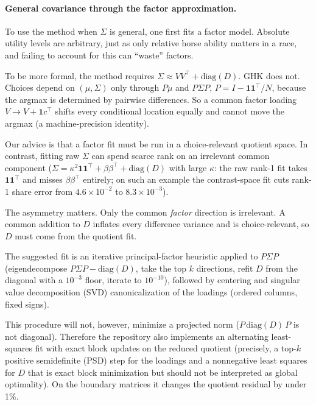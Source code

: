 \documentclass[12pt]{article}
\theoremstyle{remark}
\begin{document}
\paragraph{General covariance through the factor approximation.} 

To use the method when $\Sigma$ is general, one first fits a factor
model. Absolute utility levels are arbitrary, just as only relative
horse ability matters in a race, and failing to account for this can
``waste'' factors. 

To be more formal, the method
requires $\Sigma \approx VV^\top + \mathrm{diag}(D)$. GHK does not. Choices depend on
$(\mu, \Sigma)$ only through $P\mu$ and $P\Sigma P$, $P = I -
\mathbf{1}\mathbf{1}^\top/N$, because the argmax is determined by
pairwise differences. So a common factor loading $V \to V +
\mathbf{1}c^\top$ shifts every conditional location equally and cannot move
the argmax (a machine-precision identity). 

Our advice is that a factor fit must be run in a choice-relevant
quotient space. In contrast, fitting raw $\Sigma$ can spend
scarce rank on an irrelevant common component ($\Sigma = \kappa^2
\mathbf{1}\mathbf{1}^\top + \beta\beta^\top + \mathrm{diag}(D)$ with large $\kappa$: the
raw rank-1 fit takes $\mathbf{1}\mathbf{1}^\top$ and misses
$\beta\beta^\top$ entirely; on such an example the contrast-space fit cuts
rank-1 share error from $4.6\times10^{-2}$ to $8.3\times10^{-3}$).

The asymmetry matters. Only the common \emph{factor} direction is
irrelevant. A common addition to $D$ inflates every difference variance
and is choice-relevant, so $D$ must come from the quotient fit.

The suggested fit is an iterative principal-factor heuristic applied to $P\Sigma P$ (eigendecompose
$P\Sigma P - \mathrm{diag}(D)$, take the top $k$ directions, refit $D$ from
the diagonal with a $10^{-3}$ floor, iterate to $10^{-10}$), followed by
centering and singular value decomposition (SVD) canonicalization of the loadings (ordered columns, fixed
signs).

This procedure will not, however, minimize a projected norm
($P\,\mathrm{diag}(D)\,P$ is not diagonal). Therefore the repository also implements an alternating least-squares fit with
exact block updates on the reduced quotient (precisely, a top-$k$ positive semidefinite (PSD) step for the
loadings and a nonnegative least squares for $D$ that is exact block
minimization but should not be interpreted as global optimality). On
the boundary matrices it changes the quotient residual by under 1\%.
\end{document}
